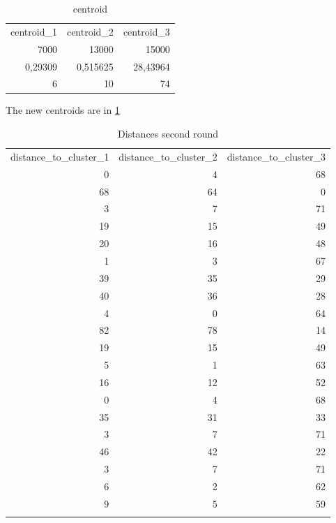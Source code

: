 \documentclass{article}
\begin{document}
\begin{table}[ht]
  \centering
  \caption{centroid}
    \begin{tabular}{rrr}
    \multicolumn{1}{l}{centroid\_1} & \multicolumn{1}{l}{centroid\_2} & \multicolumn{1}{l}{centroid\_3} \\
    7000  & 13000 & 15000 \\
    0,29309 & 0,515625 & 28,43964 \\
    6     & 10    & 74 \\
    \end{tabular}%
  \label{tab:centr1}%
\end{table}%
The new centroids are in \ref{tab:centr1}

\begin{table}[ht]
  \centering
  \caption{Distances second round}
    \begin{tabular}{rrr}
    \multicolumn{1}{l}{distance\_to\_cluster\_1} & \multicolumn{1}{l}{distance\_to\_cluster\_2} & \multicolumn{1}{l}{distance\_to\_cluster\_3} \\
    0     & 4     & 68 \\
    68    & 64    & 0 \\
    3     & 7     & 71 \\
    19    & 15    & 49 \\
    20    & 16    & 48 \\
    1     & 3     & 67 \\
    39    & 35    & 29 \\
    40    & 36    & 28 \\
    4     & 0     & 64 \\
    82    & 78    & 14 \\
    19    & 15    & 49 \\
    5     & 1     & 63 \\
    16    & 12    & 52 \\
    0     & 4     & 68 \\
    35    & 31    & 33 \\
    3     & 7     & 71 \\
    46    & 42    & 22 \\
    3     & 7     & 71 \\
    6     & 2     & 62 \\
    9     & 5     & 59 \\
          &       &  \\
    \end{tabular}%
  \label{tab:dist2}%
\end{table}%
\end{document}
